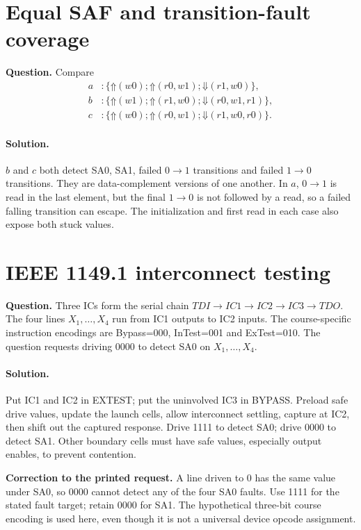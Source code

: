 \documentclass[11pt]{article}
\newcommand{\sol}{\paragraph{Solution.}}
\newcommand{\up}{\mathord{\Uparrow}}
\newcommand{\dn}{\mathord{\Downarrow}}
\begin{document}
\section{Equal SAF and transition-fault coverage}
\textbf{Question.} Compare
\begin{align*}
a&:\{\up(w0);\up(r0,w1);\dn(r1,w0)\},\\
b&:\{\up(w1);\up(r1,w0);\dn(r0,w1,r1)\},\\
c&:\{\up(w0);\up(r0,w1);\dn(r1,w0,r0)\}.
\end{align*}
\sol $b$ and $c$ both detect SA0, SA1, failed $0\to1$ transitions and
failed $1\to0$ transitions. They are data-complement versions of one another.
In $a$, $0\to1$ is read in the last element, but the final $1\to0$ is not
followed by a read, so a failed falling transition can escape.
The initialization and first read in each case also expose both stuck values.

\section{IEEE 1149.1 interconnect testing}
\textbf{Question.} Three ICs form the serial chain
$TDI\to IC1\to IC2\to IC3\to TDO$.
The four lines $X_1,\ldots,X_4$ run from IC1 outputs to IC2 inputs.
The course-specific instruction encodings are
Bypass=000, InTest=001 and ExTest=010.
The question requests driving 0000 to detect SA0 on $X_1,\ldots,X_4$.\begin{center}\end{center}

\sol Put IC1 and IC2 in EXTEST; put the uninvolved IC3 in BYPASS.
Preload safe drive values, update the launch cells, allow interconnect settling,
capture at IC2, then shift out the captured response. Drive 1111 to detect SA0;
drive 0000 to detect SA1. Other boundary cells must have safe values, especially
output enables, to prevent contention.

\textbf{Correction to the printed request.} A line driven to 0 has the same
value under SA0, so 0000 cannot detect any of the four SA0 faults.
Use 1111 for the stated fault target; retain 0000 for SA1.
The hypothetical three-bit course encoding is used here, even though it is not
a universal device opcode assignment.
\end{document}
